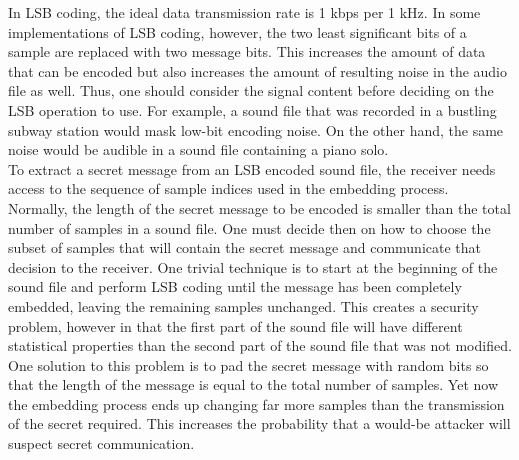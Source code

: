 \documentclass[a4paper, 12pt, notitlepage]{report}
\begin{document}
In  LSB  coding,  the  ideal  data  transmission  rate  is  1  kbps per 1 kHz. In some implementations of LSB coding, however, 
the two least significant bits of a sample are replaced with two message  bits.  This  increases  the  amount  of  data  that  can  be 
encoded but also increases the amount of resulting noise in the audio file as well. Thus, one should consider the signal content 
before  deciding  on  the  LSB  operation  to  use.  For  example,  a sound file that was recorded in a bustling subway station would 
mask  low-bit  encoding  noise.  On  the  other  hand,  the  same noise would be audible in a sound file containing a piano solo.\\ 

To  extract  a  secret  message  from  an  LSB  encoded  sound file, the receiver needs access to the sequence of sample indices 
used  in  the  embedding  process.  Normally,  the  length  of  the secret  message  to be  encoded  is  smaller  than the  total  number of  samples  in  a  sound  file.  One  must  decide  then  on  how  to choose  the  subset  of  samples  that  will  contain  the  secret message  and  communicate  that  decision  to  the  receiver.  One trivial  technique  is  to  start  at  the  beginning  of  the  sound  file and  perform  LSB  coding  until  the  message  has  been completely  embedded,  leaving  the  remaining  samples 
unchanged. This creates a security problem, however in that the first  part  of  the  sound  file  will  have  different  statistical 
properties  than  the  second  part  of  the  sound  file  that  was  not modified.  One  solution  to  this  problem  is  to  pad  the  secret message with random bits so that the length of the message is equal  to the  total  number  of samples.  Yet  now  the  embedding process  ends  up  changing  far  more  samples  than  the transmission  of  the  secret  required.  This  increases  the 
probability  that  a  would-be  attacker  will  suspect  secret communication.\\
\end{document}
